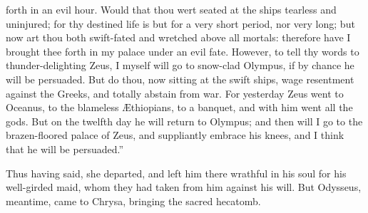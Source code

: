 \documentclass{ransom}
\begin{document}
forth in an evil
hour. Would that thou wert seated at the ships tearless and uninjured;
for thy destined life is but for a very short period, nor very long;
but now art thou both swift-fated and wretched above all mortals:
therefore have I brought thee forth in my palace under an evil fate.
However, to tell thy words to thunder-delighting Zeus, I myself will go
to snow-clad Olympus, if by chance he will be persuaded. But do thou,
now sitting at the swift ships, wage resentment against the Greeks, and
totally abstain from war. For yesterday Zeus went to Oceanus, to the
blameless Æthiopians, to a banquet, and with him went all the gods. But
on the twelfth day he will return to Olympus; and then will I go to the
brazen-floored palace of Zeus, and suppliantly embrace his knees, and I
think that he will be persuaded.”


Thus having said, she departed, and left him there wrathful in his soul
for his well-girded maid, whom they had taken from him against his
will. But Odysseus, meantime, came to Chrysa, bringing the sacred
hecatomb.







    
\end{document}
